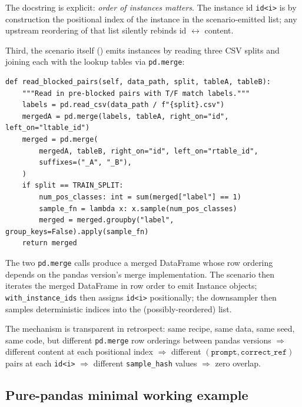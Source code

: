 \documentclass[11pt]{article}
\begin{document}
The docstring is explicit: \emph{order of instances matters}.
The instance id \texttt{id<i>} is by construction the positional
  index of the instance in the scenario-emitted list; any upstream
  reordering of that list silently rebinds id $\leftrightarrow$ content.

Third, the scenario itself
  ()
  emits instances by reading three CSV splits and joining each with
  the lookup tables via \texttt{pd.merge}:

\begin{lstlisting}[style=python, caption={HELM \path{entity_matching_scenario.py:read_blocked_pairs} (excerpt).\label{lst:tr-helm-read-blocked-pairs}}]
def read_blocked_pairs(self, data_path, split, tableA, tableB):
    """Read in pre-blocked pairs with T/F match labels."""
    labels = pd.read_csv(data_path / f"{split}.csv")
    mergedA = pd.merge(labels, tableA, right_on="id", left_on="ltable_id")
    merged = pd.merge(
        mergedA, tableB, right_on="id", left_on="rtable_id",
        suffixes=("_A", "_B"),
    )
    if split == TRAIN_SPLIT:
        num_pos_classes: int = sum(merged["label"] == 1)
        sample_fn = lambda x: x.sample(num_pos_classes)
        merged = merged.groupby("label", group_keys=False).apply(sample_fn)
    return merged
\end{lstlisting}

The two \texttt{pd.merge} calls produce a merged DataFrame whose row
  ordering depends on the pandas version's merge implementation.
The scenario then iterates the merged DataFrame in row order to emit
  Instance objects; \texttt{with\_instance\_ids} then assigns
  \texttt{id<i>} positionally; the downsampler then samples deterministic
  indices into the (possibly-reordered) list.

The mechanism is transparent in retrospect: same recipe, same data,
  same seed, same code, but different \texttt{pd.merge} row orderings
  between pandas versions $\Rightarrow$ different content at each
  positional index $\Rightarrow$ different
  $(\texttt{prompt}, \texttt{correct\_ref})$ pairs at each
  \texttt{id<i>} $\Rightarrow$ different
  \texttt{sample\_hash} values $\Rightarrow$ zero overlap.

\subsection{Pure-pandas minimal working example}
\label{sec:tr-case-a-pure-pandas-mwe}
\end{document}
